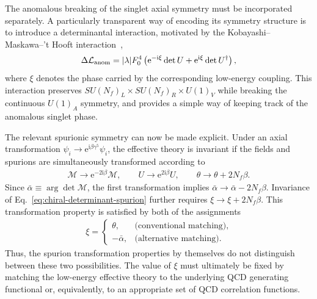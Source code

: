 \documentclass[review]{elsarticle}
\numberwithin{equation}{section}
\numberwithin{table}{section}
\numberwithin{figure}{section}
\def\i{\mathrm{i}}
\def\e{\mathrm{e}}
\def\M{\mathcal{M}}
\begin{document}
The anomalous breaking of the singlet axial symmetry must be incorporated separately. A particularly transparent way of encoding its symmetry structure is to introduce a determinantal interaction, motivated by the Kobayashi--Maskawa--'t Hooft interaction~\cite{Kobayashi:1970ji,Kobayashi:1971qz,tHooft:1976snw},
\begin{align}
    \Delta\mathcal{L}_{\rm anom}
    =
    |\lambda|F_0^4 \left(\e^{-\i\xi}\det U + \e^{\i\xi}\det U^\dagger \right),
    \label{eq:chiral-determinant-spurion}
\end{align}
where $\xi$ denotes the phase carried by the corresponding low-energy coupling. This interaction preserves $SU(N_f)_L\times SU(N_f)_R\times U(1)_V$ while breaking the continuous $U(1)_A$ symmetry, and provides a simple way of keeping track of the anomalous singlet phase.

The relevant spurionic symmetry can now be made explicit. Under an axial transformation $\psi_i\to\e^{\i\beta\gamma^5}\psi_i$, the effective theory is invariant if the fields and spurions are simultaneously transformed according to
\begin{align}
    \M \to \e^{-2\i\beta}\M,
    \qquad
    U \to \e^{2\i\beta}U,
    \qquad 
    \theta\to\theta+2N_f\beta.
    \label{eq:chiral-spurion-transformation}
\end{align}
Since $\bar\alpha\equiv\arg\det\M$, the first transformation implies $\bar\alpha\to\bar\alpha-2N_f\beta$. Invariance of Eq.~\eqref{eq:chiral-determinant-spurion} further requires $\xi\to\xi+2N_f\beta$. This transformation property is satisfied by both of the assignments~\cite{Ai:2020ptm,Ai:2024cnp,Ai:2025quf}
\begin{align}
    \xi= 
    \begin{cases}
    \theta, &\text{(conventional matching)},\\
    -\bar\alpha,&\text{(alternative matching)}.
    \end{cases}
    \label{eq:options}
\end{align}
Thus, the spurion transformation properties by themselves do not distinguish between these two possibilities. The value of $\xi$ must ultimately be fixed by matching the low-energy effective theory to the underlying QCD generating functional or, equivalently, to an appropriate set of QCD correlation functions.
\end{document}
